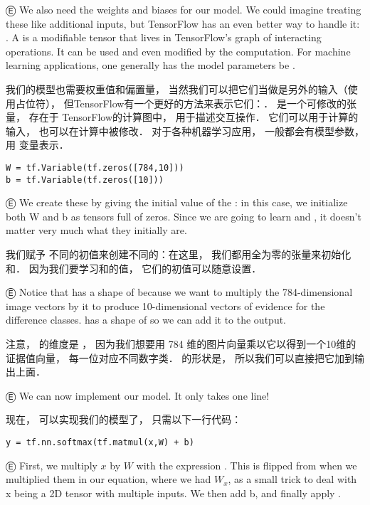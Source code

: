 
Ⓔ We also need the weights and biases for our model. We could imagine treating these like additional inputs, but TensorFlow has an even better way to handle it: . A  is a modifiable tensor that lives in TensorFlow's graph of interacting operations. It can be used and even modified by the computation. For machine learning applications, one generally has the model parameters be .

我们的模型也需要权重值和偏置量， 当然我们可以把它们当做是另外的输入（使用占位符）， 但TensorFlow有一个更好的方法来表示它们：．   是一个可修改的张量， 存在于 TensorFlow的计算图中， 用于描述交互操作．  它们可以用于计算的输入， 也可以在计算中被修改．  对于各种机器学习应用， 一般都会有模型参数， 用 变量表示．

\begin{lstlisting}
W = tf.Variable(tf.zeros([784,10]))
b = tf.Variable(tf.zeros([10]))
\end{lstlisting}

Ⓔ We create these  by giving  the initial value of the : in this case, we initialize both W and b as tensors full of zeros. Since we are going to learn  and , it doesn't matter very much what they initially are.

我们赋予 不同的初值来创建不同的：在这里， 我们都用全为零的张量来初始化和．  因为我们要学习和的值， 它们的初值可以随意设置．


Ⓔ Notice that  has a shape of \li{[784, 10]} because we want to multiply the 784-dimensional image vectors by it to produce 10-dimensional vectors of evidence for the difference classes.  has a shape of \li{[10]} so we can add it to the output.


注意，  的维度是 \li{[784, 10]}， 因为我们想要用 784 维的图片向量乘以它以得到一个10维的证据值向量， 每一位对应不同数字类．  的形状是\li{[10]}， 所以我们可以直接把它加到输出上面．

Ⓔ We can now implement our model. It only takes one line!

现在， 可以实现我们的模型了， 只需以下一行代码：

\begin{lstlisting}
y = tf.nn.softmax(tf.matmul(x,W) + b)
\end{lstlisting}

Ⓔ First, we multiply $x$ by $W$ with the expression . This is flipped from when we multiplied them in our equation, where we had $W_x$, as a small trick to deal with x being a 2D tensor with multiple inputs. We then add b, and finally apply .

